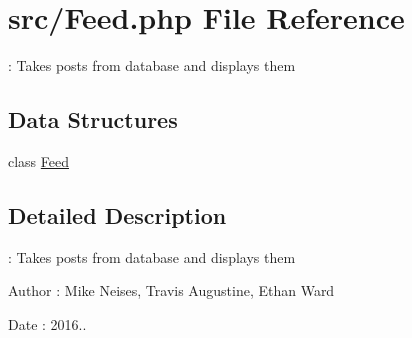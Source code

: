 \hypertarget{_feed_8php}{}\section{src/\+Feed.php File Reference}
\label{_feed_8php}


\+: Takes posts from database and displays them  


\subsection*{Data Structures}
\begin{DoxyCompactItemize}
\item 
class \hyperlink{class_feed}{Feed}
\end{DoxyCompactItemize}


\subsection{Detailed Description}
\+: Takes posts from database and displays them 

\begin{DoxyAuthor}{Author}
\+: Mike Neises, Travis Augustine, Ethan Ward 
\end{DoxyAuthor}
\begin{DoxyDate}{Date}
\+: 2016.. 
\end{DoxyDate}
